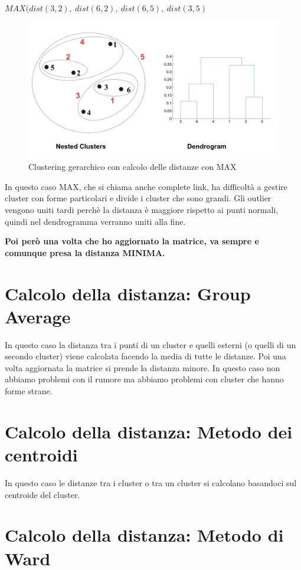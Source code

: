 \documentclass[14pt]{extreport}
\begin{document}
$MAX(dist(3,2), \ dist(6,2), \ dist(6,5), \ dist(3,5)$


\begin{figure}[H]
  \centering\includegraphics[width=\linewidth]{MAX.png}
  \caption{Clustering gerarchico con calcolo delle distanze con MAX}
\end{figure}

In questo caso MAX, che si chiama anche complete link, ha difficoltà a gestire cluster con forme particolari e divide i cluster che sono grandi. Gli outlier vengono uniti tardi perchè la distanza è maggiore rispetto ai punti normali, quindi nel dendrogramma verranno uniti alla fine.

{\bf Poi però una volta che ho aggiornato la matrice, va sempre e comunque presa la distanza MINIMA.}

\section{Calcolo della distanza: Group Average}

In questo caso la distanza tra i punti di un cluster e quelli esterni (o quelli di un secondo cluster) viene calcolata facendo la media di tutte le distanze.
Poi una volta aggiornata la matrice si prende la distanza minore.
In questo caso non abbiamo problemi con il rumore ma abbiamo problemi con cluster che hanno forme strane.

\section{Calcolo della distanza: Metodo dei centroidi}

In questo caso le distanze tra i cluster o tra un cluster si calcolano basandoci sul centroide del cluster.

\section{Calcolo della distanza: Metodo di Ward}
\end{document}
